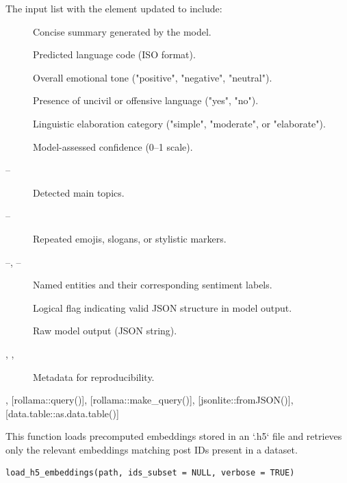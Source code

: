 \documentclass[a4paper]{book}
\begin{document}
\begin{Value}
The input  list with the  element updated to include:
\begin{description}

\item[] Concise summary generated by the model.
\item[] Predicted language code (ISO format).
\item[] Overall emotional tone ("positive", "negative", "neutral").
\item[] Presence of uncivil or offensive language ("yes", "no").
\item[] Linguistic elaboration category ("simple", "moderate", or "elaborate").
\item[] Model-assessed confidence (0–1 scale).
\item[–] Detected main topics.
\item[–] Repeated emojis, slogans, or stylistic markers.
\item[–, –] Named entities 
and their corresponding sentiment labels.
\item[] Logical flag indicating valid JSON structure in model output.
\item[] Raw model output (JSON string).
\item[, , ] Metadata for reproducibility.

\end{description}

\end{Value}
%
\begin{SeeAlso}
, [rollama::query()], [rollama::make\_query()], 
[jsonlite::fromJSON()], [data.table::as.data.table()]
\end{SeeAlso}
%
\begin{Description}
This function loads precomputed embeddings stored in an `.h5` file and retrieves only the relevant embeddings matching post IDs present in a dataset.
\end{Description}
%
\begin{Usage}
\begin{verbatim}
load_h5_embeddings(path, ids_subset = NULL, verbose = TRUE)
\end{verbatim}
\end{Usage}
\end{document}

